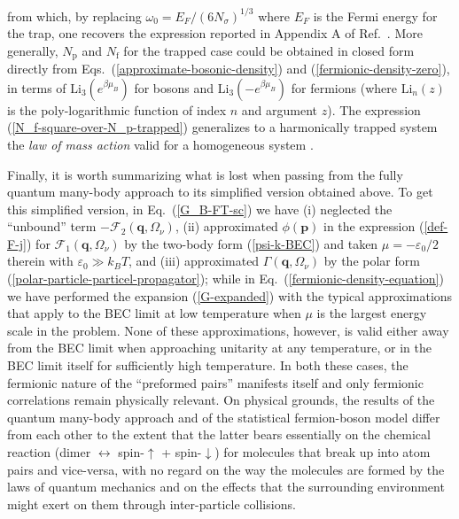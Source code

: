 \documentclass[pra,twocolumn,aps,amssymb,showpacs,superscriptaddress]{revtex4-1}
\begin{document}
from which, by replacing $\omega_{0} = E_{F} / (6N_{\sigma})^{1/3}$ where $E_{F}$ is the Fermi energy for the trap, one recovers the expression reported in Appendix A of
Ref.~\cite{Ulm-Cam-2019}.
More generally, $N_{\mathrm{p}}$ and $N_{\mathrm{f}}$ for the trapped case could be obtained in closed form directly from Eqs.~(\ref{approximate-bosonic-density}) and (\ref{fermionic-density-zero}), in terms of $\text{Li}_3(e^{\beta\mu_{B}})$ for bosons and $\text{Li}_3(-e^{\beta\mu_{B}})$ for fermions (where $\text{Li}_n(z)$ is the poly-logarithmic function of index $n$ and argument $z$).
The expression (\ref{N_f-square-over-N_p-trapped}) generalizes to a harmonically trapped system the \emph{law of mass action} valid for a homogeneous system \cite{LL-1999}.

Finally, it is worth summarizing what is lost when passing from the fully quantum many-body approach to its simplified version obtained above.
To get this simplified version, in Eq.~(\ref{G_B-FT-sc}) we have 
(i) neglected the ``unbound'' term $-\mathcal{F}_{2}(\mathbf{q},\Omega_{\nu})$, 
(ii) approximated $\phi({\mathbf p})$ in the expression (\ref{def-F-j}) for $\mathcal{F}_{1}(\mathbf{q},\Omega_{\nu})$ by the two-body form (\ref{psi-k-BEC}) and taken $\mu = - \varepsilon_{0}/2$ therein
with $\varepsilon_{0} \gg k_{B} T$,
and (iii) approximated $\Gamma(\mathbf{q},\Omega_{\nu})$ by the polar form (\ref{polar-particle-particel-propagator});
while in Eq.~(\ref{fermionic-density-equation}) we have performed the expansion (\ref{G-expanded}) with the typical approximations that apply to the BEC limit at low temperature when $\mu$ is the largest energy scale
in the problem.
None of these approximations, however, is valid either away from the BEC limit when approaching unitarity at any temperature, or in the BEC limit itself for sufficiently high temperature.
In both these cases, the fermionic nature of the ``preformed pairs'' manifests itself and only fermionic correlations remain physically relevant.
On physical grounds, the results of the quantum many-body approach and of the statistical fermion-boson model differ from each other to the extent that the latter bears essentially on the chemical 
reaction (dimer $\longleftrightarrow$ spin-$\uparrow$ + spin-$\downarrow$) for
molecules that break up into atom pairs and vice-versa, with no regard on the way the molecules are formed by the laws of quantum mechanics and on the effects that the surrounding 
environment might exert on them through inter-particle collisions.
\end{document}
